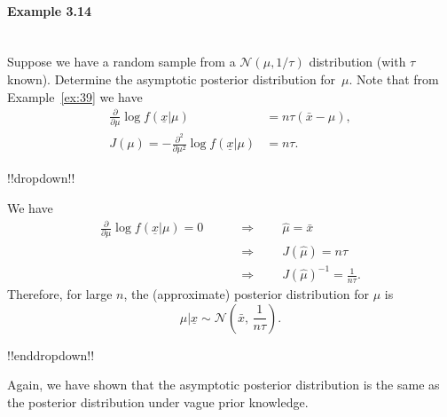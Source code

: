 \paragraph{Example 3.14}{~\\
Suppose we have a random sample from a $\mathcal{N}(\mu,1/\tau)$ distribution
(with $\tau$ known). Determine the asymptotic posterior distribution
for~$\mu$. Note that from Example~\ref{ex:39} we have
\begin{align*}
\frac{\partial}{\partial\mu} \log
f(\underline{x}|\mu)&=n\tau(\bar x-\mu), \\
J(\mu)=-\frac{\partial^2}{\partial\mu^2} \log
f(\underline{x}|\mu)&=n\tau.
\end{align*}



!!dropdown!!

We have
    \begin{align*}
    \frac{\partial}{\partial\mu} \log f(\underline{x}|\mu)=0
    \quad\quad&\Longrightarrow\quad\quad
    \hat\mu=\bar x \\
    &\Longrightarrow\quad\quad
    J(\hat\mu)=n\tau \\
    &\Longrightarrow\quad\quad
    J(\hat\mu)^{-1}=\frac{1}{n\tau}.
    \end{align*}
    Therefore, for large $n$, the (approximate) posterior distribution for $\mu$ is
    $$
    \mu|\underline{x}\sim \mathcal{N}\left(\bar x,\,\frac{1}{n\tau}\right).
    $$

!!enddropdown!!

Again, we have shown that the asymptotic posterior distribution is the
same as the posterior distribution under vague prior knowledge.}

